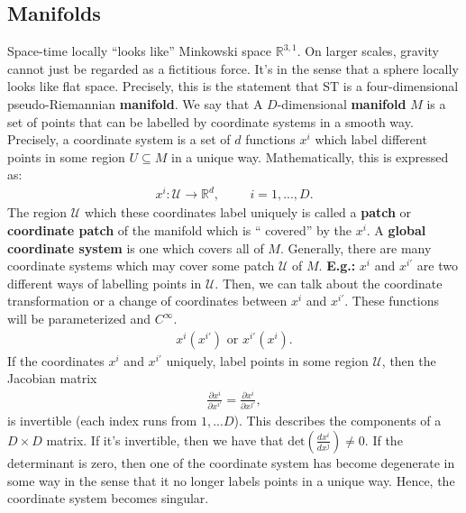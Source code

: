 \documentclass[11pt]{article}
\newcommand{\R}[0]{\mathbb{R}}
\theoremstyle{definition}
\begin{document}
\subsection{Manifolds}
Space-time locally ``looks like'' Minkowski space \( \R^{3,1} \). On larger scales, gravity cannot just be regarded as a fictitious force. It's in the sense that a sphere locally looks like flat space. Precisely, this is the statement that ST is a four-dimensional pseudo-Riemannian \textbf{manifold}. We say that A \( D \)-dimensional \textbf{manifold} \( M \) is a set of points that can be labelled by coordinate systems in a smooth way. 
\newline
\newline
Precisely, a coordinate system is a set of \( d \) functions \( x^i \) which label different points in some region \( U \subseteq M \) in a unique way. Mathematically, this is expressed as:
\begin{align*}
	x^i: \mathcal{U} \rightarrow \R^d, \hspace{1cm} i = 1, ..., D.
\end{align*}
The region \( \mathcal{U} \) which these coordinates label uniquely is called a \textbf{patch} or \textbf{coordinate patch} of the manifold which is `` covered'' by the \( x^i \). A \textbf{global coordinate system} is one which covers all of \( M \). Generally, there are many coordinate systems which may cover some patch \( \mathcal{U} \) of \( M \). 
\newline
\newline
\textbf{E.g.:} \( x^i \) and \( x^{i'} \) are two different ways of labelling points in \( \mathcal{U} \). Then, we can talk about the coordinate transformation or a change of coordinates between \( x^i \) and \( x^{i'} \). These functions will be parameterized and \( C^\infty \). 
\begin{align*}
	x^i(x^{i'}) \text{ or } x^{i'}(x^i).
\end{align*}
If the coordinates \( x^i \) and \( x^{i'} \) uniquely, label points in some region \( \mathcal{U} \), then the Jacobian matrix
\begin{align*}
	\frac{\partial x^i}{\partial x^{i'}} = \frac{\partial x^{i}}{\partial x^{j'}}, 
\end{align*}
is invertible (each index runs from \(1, ...D \)). This describes the components of a \( D \times D \) matrix. If it's invertible, then we have that \( \text{det}\left(\frac{dx^i}{dx^j}  \right) \neq 0 \). If the determinant is zero, then one of the coordinate system has become degenerate in some way in the sense that it no longer labels points in a unique way. Hence, the coordinate system becomes singular. 
\end{document}
